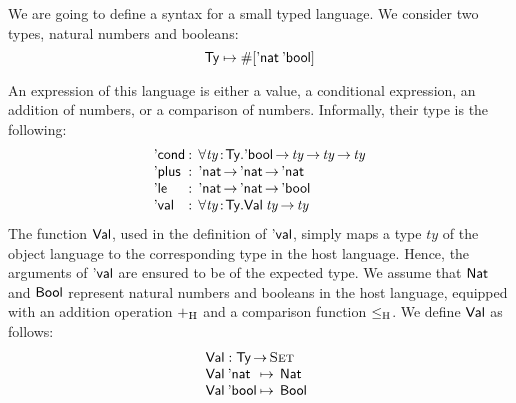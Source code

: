 \newcommand{\SYMBEval}{\etag{\CN{val}}\xspace}
\newcommand{\Eval}[1]{\SYMBEval\:#1}
\newcommand{\SYMBEcond}{\etag{\CN{cond}}\xspace}
\newcommand{\Econd}[3]{\SYMBEcond\:#1\:#2\:#3}
\newcommand{\SYMBEplus}{\etag{\CN{plus}}\xspace}
\newcommand{\Eplus}[2]{\SYMBEplus\:#1\:#2}
\newcommand{\SYMBEle}{\etag{\CN{le}}\xspace}
\newcommand{\Ele}[2]{\SYMBEle\:#1\:#2}

\newcommand{\SYMBVal}{\F{Val}\xspace}
\newcommand{\Val}[1]{\SYMBVal\:#1}
\newcommand{\SYMBVar}{\F{Var}\xspace}
\newcommand{\Var}[2]{\SYMBVar\: #1\: #2}

\newcommand{\HExprD}{\C{ExprD}}
\newcommand{\HExprAD}{\C{ExprAD}}
\newcommand{\HExprID}{\C{ExprID}}
\newcommand{\HExprVarD}[1]{\C{ExprD}_{\F{Var},#1}}
\newcommand{\HExprFreeD}{\C{ExprD}^{\C{Free}}}
\newcommand{\HExprAFreeD}{\C{ExprAD}^{\C{Free}}}

We are going to define a syntax for a small typed language. We
consider two types, natural numbers and booleans:
%
\[
\Ty \mapsto \EnumT{\sqr{\Enat\: \Ebool}}
\]

\newcommand{\plusHost}{\mathop{\green{+_{\mathrm{H}}}}}
\newcommand{\leHost}{\mathop{\green{\leq_{\mathrm{H}}}}}


An expression of this language is either a value, a conditional
expression, an addition of numbers, or a comparison of
numbers. Informally, their type is the following:
%
\[
\begin{array}{l@{\::\:\:}l}
\SYMBEcond           & \forall \Bhab{\V{ty}}{\Ty} . \Ebool \To \V{ty} \To \V{ty} \To \V{ty}  \\ 
\SYMBEplus           & \Enat \To \Enat \To \Enat                           \\
\SYMBEle             & \Enat \To \Enat \To \Ebool                          \\
\SYMBEval            & \forall \Bhab{\V{ty}}{\Ty} . \Val{\V{ty}} \To \V{ty}
\end{array}
\]
%
The function $\SYMBVal$, used in the definition of $\SYMBEval$, simply
maps a type $ty$ of the object language to the corresponding type in
the host language. Hence, the arguments of $\SYMBEval$ are ensured to
be of the expected type. We assume that $\Nat$ and $\Bool$ represent
natural numbers and booleans in the host language, equipped with an
addition operation $\plusHost$ and a comparison function
$\leHost$. We define $\SYMBVal$ as follows:
%
\[\stk{
\SYMBVal : \Ty \To \Set \\
\begin{array}{@{}l@{\:\mapsto\:\:}l}
\Val{\Enat}   & \Nat \\
\Val{\Ebool}  & \Bool
\end{array}
}\]

